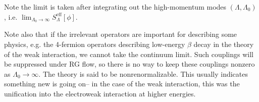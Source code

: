 Note the limit is taken after integrating out the high-momentum modes $(\Lambda,\Lambda_0)$, i.e. $\lim_{\Lambda_0\to\infty} S_\Lambda^\text{eff}[\phi]$.

Note also that if the irrelevant operators are important for describing some physics, e.g. the 4-fermion operators describing low-energy $\beta$ decay in the theory of the weak interaction, we cannot take the continuum limit. Such couplings will be suppressed under RG flow, so there is no way to keep these couplings nonzero as $\Lambda_0\to \infty$. The theory is said to be nonrenormalizable.
This usually indicates something new is going on-- in the case of the weak interaction, this was the unification into the electroweak interaction at higher energies. 